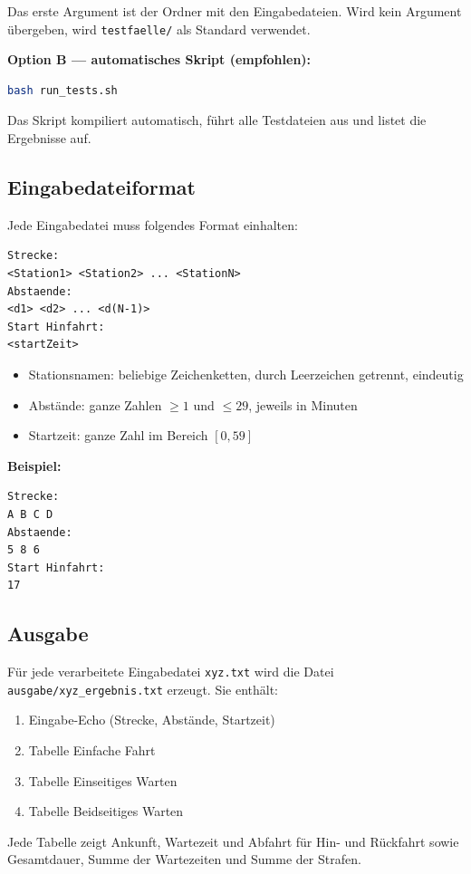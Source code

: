 \documentclass[12pt,a4paper]{article}
\begin{document}
Das erste Argument ist der Ordner mit den Eingabedateien.
Wird kein Argument übergeben, wird \texttt{testfaelle/} als Standard verwendet.

\textbf{Option B — automatisches Skript (empfohlen):}
\begin{lstlisting}[language=bash, numbers=none]
bash run_tests.sh
\end{lstlisting}
Das Skript kompiliert automatisch, führt alle Testdateien aus und listet die Ergebnisse auf.

\subsection{Eingabedateiformat}

Jede Eingabedatei muss folgendes Format einhalten:

\begin{lstlisting}[language={}, numbers=none]
Strecke:
<Station1> <Station2> ... <StationN>
Abstaende:
<d1> <d2> ... <d(N-1)>
Start Hinfahrt:
<startZeit>
\end{lstlisting}

\begin{itemize}
  \item Stationsnamen: beliebige Zeichenketten, durch Leerzeichen getrennt, eindeutig
  \item Abstände: ganze Zahlen $\geq 1$ und $\leq 29$, jeweils in Minuten
  \item Startzeit: ganze Zahl im Bereich $[0, 59]$
\end{itemize}

\textbf{Beispiel:}
\begin{lstlisting}[language={}, numbers=none]
Strecke:
A B C D
Abstaende:
5 8 6
Start Hinfahrt:
17
\end{lstlisting}

\subsection{Ausgabe}

Für jede verarbeitete Eingabedatei \texttt{xyz.txt} wird die Datei\\
\texttt{ausgabe/xyz\_ergebnis.txt} erzeugt. Sie enthält:
\begin{enumerate}
  \item Eingabe-Echo (Strecke, Abstände, Startzeit)
  \item Tabelle Einfache Fahrt
  \item Tabelle Einseitiges Warten
  \item Tabelle Beidseitiges Warten
\end{enumerate}
Jede Tabelle zeigt Ankunft, Wartezeit und Abfahrt für Hin- und Rückfahrt
sowie Gesamtdauer, Summe der Wartezeiten und Summe der Strafen.
\end{document}
